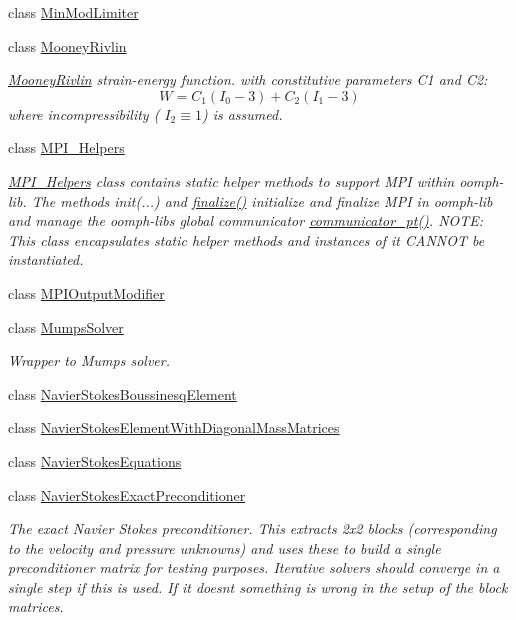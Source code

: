 \begin{DoxyCompactItemize}
class \hyperlink{classoomph_1_1MinModLimiter}{Min\+Mod\+Limiter}
\item 
class \hyperlink{classoomph_1_1MooneyRivlin}{Mooney\+Rivlin}
\begin{DoxyCompactList}\small\item\em \hyperlink{classoomph_1_1MooneyRivlin}{Mooney\+Rivlin} strain-\/energy function. with constitutive parameters C1 and C2\+: \[ W = C_1 (I_0 - 3) + C_2 (I_1 - 3) \] where incompressibility ( $ I_2 \equiv 1$) is assumed. \end{DoxyCompactList}\item 
class \hyperlink{classoomph_1_1MPI__Helpers}{M\+P\+I\+\_\+\+Helpers}
\begin{DoxyCompactList}\small\item\em \hyperlink{classoomph_1_1MPI__Helpers}{M\+P\+I\+\_\+\+Helpers} class contains static helper methods to support M\+PI within oomph-\/lib. The methods init(...) and \hyperlink{classoomph_1_1MPI__Helpers_a471bc4697fd5edeea3fb4af1bba0e541}{finalize()} initialize and finalize M\+PI in oomph-\/lib and manage the oomph-\/libs global communicator \hyperlink{classoomph_1_1MPI__Helpers_ac16964b22bfd4f657490802beb600ffe}{communicator\+\_\+pt()}. N\+O\+TE\+: This class encapsulates static helper methods and instances of it C\+A\+N\+N\+OT be instantiated. \end{DoxyCompactList}\item 
class \hyperlink{classoomph_1_1MPIOutputModifier}{M\+P\+I\+Output\+Modifier}
\item 
class \hyperlink{classoomph_1_1MumpsSolver}{Mumps\+Solver}
\begin{DoxyCompactList}\small\item\em Wrapper to Mumps solver. \end{DoxyCompactList}\item 
class \hyperlink{classoomph_1_1NavierStokesBoussinesqElement}{Navier\+Stokes\+Boussinesq\+Element}
\item 
class \hyperlink{classoomph_1_1NavierStokesElementWithDiagonalMassMatrices}{Navier\+Stokes\+Element\+With\+Diagonal\+Mass\+Matrices}
\item 
class \hyperlink{classoomph_1_1NavierStokesEquations}{Navier\+Stokes\+Equations}
\item 
class \hyperlink{classoomph_1_1NavierStokesExactPreconditioner}{Navier\+Stokes\+Exact\+Preconditioner}
\begin{DoxyCompactList}\small\item\em The exact Navier Stokes preconditioner. This extracts 2x2 blocks (corresponding to the velocity and pressure unknowns) and uses these to build a single preconditioner matrix for testing purposes. Iterative solvers should converge in a single step if this is used. If it doesn\textquotesingle{}t something is wrong in the setup of the block matrices. \end{DoxyCompactList}\item 

\end{DoxyCompactItemize}
